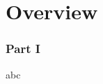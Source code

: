\documentclass{beamer}
\begin{document}
    \section{Overview}

    \begin{frame}
        \frametitle{Part I}
        abc
    \end{frame} 
\end{document}
